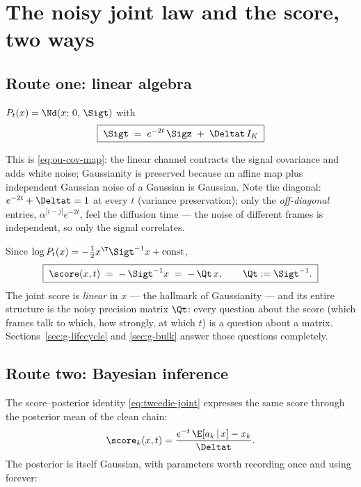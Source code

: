 \section{The noisy joint law and the score, two ways}\label{sec:g-score}

\subsection{Route one: linear algebra}

\begin{proposition}\label{prop:g-Sigt}
$P_t(x) = \Nd(x;\, 0,\, \Sigt)$ with
\begin{equation}
  \boxed{\;\Sigt \;=\; e^{-2t}\, \Sigz \;+\; \Deltat\, I_K\;}
  \label{eq:g-Sigt}
\end{equation}
\end{proposition}
This is \eqref{eq:ou-cov-map}: the linear channel contracts the signal
covariance and adds white noise; Gaussianity is preserved because an affine
map plus independent Gaussian noise of a Gaussian is Gaussian. Note the
diagonal: $e^{-2t} + \Deltat = 1$ at every $t$ (variance preservation);
only the \emph{off-diagonal} entries, $\alpha^{|i-j|} e^{-2t}$, feel the
diffusion time --- the noise of different frames is independent, so only
the signal correlates.

Since $\log P_t(x) = -\tfrac{1}{2} x^\T \Sigt^{-1} x + \text{const}$,
\begin{equation}
  \boxed{\;\score(x, t) \;=\; -\,\Sigt^{-1} x \;=\; -\,\Qt\, x,
  \qquad \Qt := \Sigt^{-1}.\;}
  \label{eq:g-score-matrix}
\end{equation}
The joint score is \emph{linear} in $x$ --- the hallmark of Gaussianity ---
and its entire structure is the noisy precision matrix $\Qt$: every question
about the score (which frames talk to which, how strongly, at which $t$) is
a question about a matrix. Sections~\ref{sec:g-lifecycle} and
\ref{sec:g-bulk} answer those questions completely.

\subsection{Route two: Bayesian inference}

The score--posterior identity \eqref{eq:tweedie-joint} expresses the same
score through the posterior mean of the clean chain:
\begin{equation}
  \score_k(x, t)
  = \frac{e^{-t}\, \E[a_k \,|\, x] - x_k}{\Deltat} .
  \label{eq:g-tweedie}
\end{equation}
The posterior is itself Gaussian, with parameters worth recording once and
using forever:

